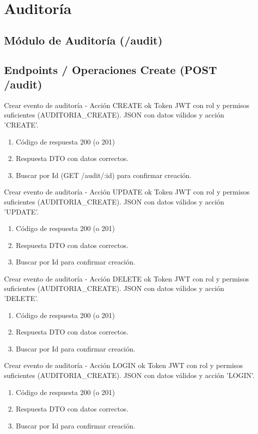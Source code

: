 \section{Auditoría}
\subsection{Módulo de Auditoría (/audit)}

\subsection{Endpoints / Operaciones Create (POST /audit)}

{Crear evento de auditoría - Acción CREATE ok}
{Token JWT con rol y permisos suficientes (AUDITORIA\_CREATE).}
{JSON con datos válidos y acción 'CREATE'.}
{\begin{enumerate} [leftmargin=*, nosep]
    \item Código de respuesta 200 (o 201)
    \item Respuesta DTO con datos correctos.
    \item Buscar por Id (GET /audit/:id) para confirmar creación.
\end{enumerate}}

{Crear evento de auditoría - Acción UPDATE ok}
{Token JWT con rol y permisos suficientes (AUDITORIA\_CREATE).}
{JSON con datos válidos y acción 'UPDATE'.}
{\begin{enumerate} [leftmargin=*, nosep]
    \item Código de respuesta 200 (o 201)
    \item Respuesta DTO con datos correctos.
    \item Buscar por Id para confirmar creación.
\end{enumerate}}

{Crear evento de auditoría - Acción DELETE ok}
{Token JWT con rol y permisos suficientes (AUDITORIA\_CREATE).}
{JSON con datos válidos y acción 'DELETE'.}
{\begin{enumerate} [leftmargin=*, nosep]
    \item Código de respuesta 200 (o 201)
    \item Respuesta DTO con datos correctos.
    \item Buscar por Id para confirmar creación.
\end{enumerate}}

{Crear evento de auditoría - Acción LOGIN ok}
{Token JWT con rol y permisos suficientes (AUDITORIA\_CREATE).}
{JSON con datos válidos y acción 'LOGIN'.}
{\begin{enumerate} [leftmargin=*, nosep]
    \item Código de respuesta 200 (o 201)
    \item Respuesta DTO con datos correctos.
    \item Buscar por Id para confirmar creación.
\end{enumerate}}

